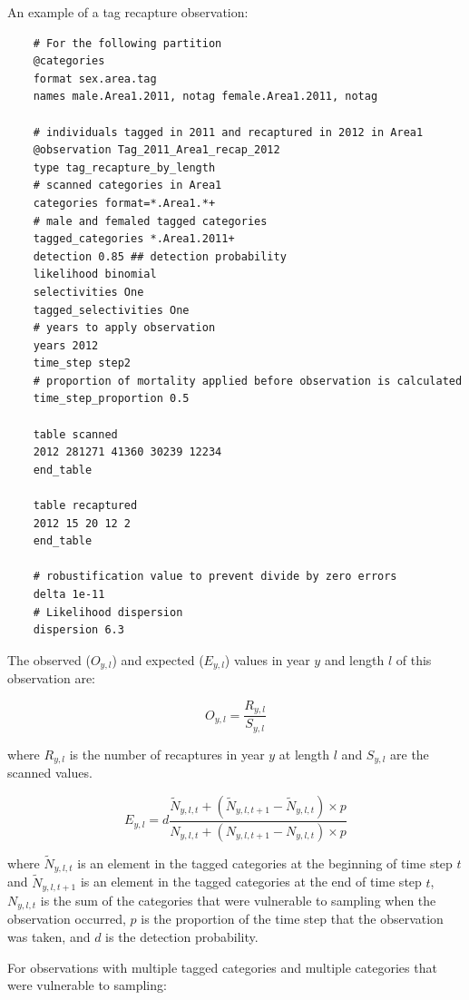 An example of a tag recapture observation:

{\small{\begin{verbatim}
	# For the following partition
	@categories
	format sex.area.tag
	names male.Area1.2011, notag female.Area1.2011, notag
	
	# individuals tagged in 2011 and recaptured in 2012 in Area1
	@observation Tag_2011_Area1_recap_2012
	type tag_recapture_by_length
	# scanned categories in Area1
	categories format=*.Area1.*+
	# male and femaled tagged categories
	tagged_categories *.Area1.2011+
	detection 0.85 ## detection probability
	likelihood binomial
	selectivities One
	tagged_selectivities One
	# years to apply observation
	years 2012
	time_step step2
	# proportion of mortality applied before observation is calculated
	time_step_proportion 0.5
	
	table scanned
	2012 281271 41360 30239 12234
	end_table
	
	table recaptured
	2012 15 20 12 2
	end_table
	
	# robustification value to prevent divide by zero errors
	delta 1e-11
	# Likelihood dispersion
	dispersion 6.3
\end{verbatim}}}

The observed ($O_{y,l}$) and expected ($E_{y,l}$) values in year $y$ and length $l$ of this observation are:

\begin{equation}
	O_{y,l} = \frac{R_{y,l}}{S_{y,l}}
\end{equation}

where $R_{y,l}$ is the number of recaptures in year $y$ at length $l$ and $S_{y,l}$ are the scanned values.

\begin{equation}
	E_{y,l} = d \frac{\tilde{N}_{y,l,t} +  (\tilde{N}_{y,l,t + 1} - \tilde{N}_{y,l,t}) \times p}
	{N_{y,l,t} + (N_{y,l,t+1} - N_{y,l,t}) \times p}
\end{equation}

where $\tilde{N}_{y,l,t}$ is an element in the tagged categories at the beginning of time step $t$ and $\tilde{N}_{y,l,t + 1}$ is an element in the tagged categories at the end of time step $t$, $N_{y,l,t}$ is the sum of the categories that were vulnerable to sampling when the observation occurred, $p$ is the proportion of the time step that the observation was taken, and $d$ is the detection probability.

For observations with multiple tagged categories and multiple categories that were vulnerable to sampling:


